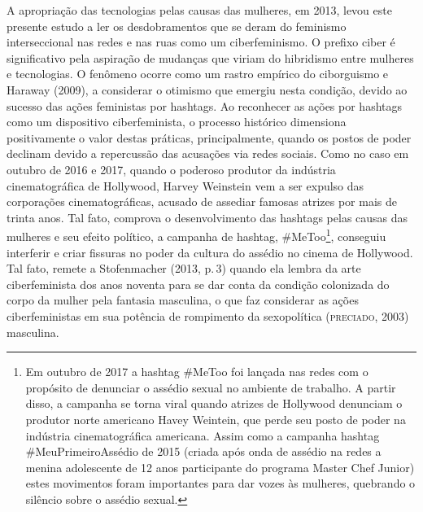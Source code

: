 A apropriação das tecnologias pelas causas das mulheres, em 2013, levou
este presente estudo a ler os desdobramentos que se deram do feminismo
interseccional nas redes e nas ruas como um ciberfeminismo. O prefixo
ciber é significativo pela aspiração de mudanças que viriam do
hibridismo entre mulheres e tecnologias. O fenômeno ocorre como um
rastro empírico do ciborguismo e Haraway (2009), a considerar o otimismo
que emergiu nesta condição, devido ao sucesso das ações feministas por
hashtags. Ao reconhecer as ações por hashtags como um dispositivo
ciberfeminista, o processo histórico dimensiona positivamente o valor
destas práticas, principalmente, quando os postos de poder declinam
devido a repercussão das acusações via redes sociais. Como no caso em
outubro de 2016 e 2017, quando o poderoso produtor da indústria
cinematográfica de Hollywood, Harvey Weinstein vem a ser expulso das
corporações cinematográficas, acusado de assediar famosas atrizes por
mais de trinta anos. Tal fato, comprova o desenvolvimento das hashtags
pelas causas das mulheres e seu efeito político, a campanha de hashtag,
\#MeToo\footnote{Em outubro de 2017 a hashtag \#MeToo foi lançada nas
  redes com o propósito de denunciar o assédio sexual no ambiente de
  trabalho. A partir disso, a campanha se torna viral quando atrizes de
  Hollywood denunciam o produtor norte americano Havey Weintein, que
  perde seu posto de poder na indústria cinematográfica americana. Assim
  como a campanha hashtag \#MeuPrimeiroAssédio de 2015 (criada após onda
  de assédio na redes a menina adolescente de 12 anos participante do
  programa Master Chef Junior) estes movimentos foram importantes para
  dar vozes às mulheres, quebrando o silêncio sobre o assédio sexual.},
conseguiu interferir e criar fissuras no poder da cultura do assédio no
cinema de Hollywood. Tal fato, remete a Stofenmacher (2013, p.\,3) quando
ela lembra da arte ciberfeminista dos anos noventa para se dar conta da
condição colonizada do corpo da mulher pela fantasia masculina, o que
faz considerar as ações ciberfeministas em sua potência de rompimento da
sexopolítica (\textsc{preciado}, 2003) masculina.

